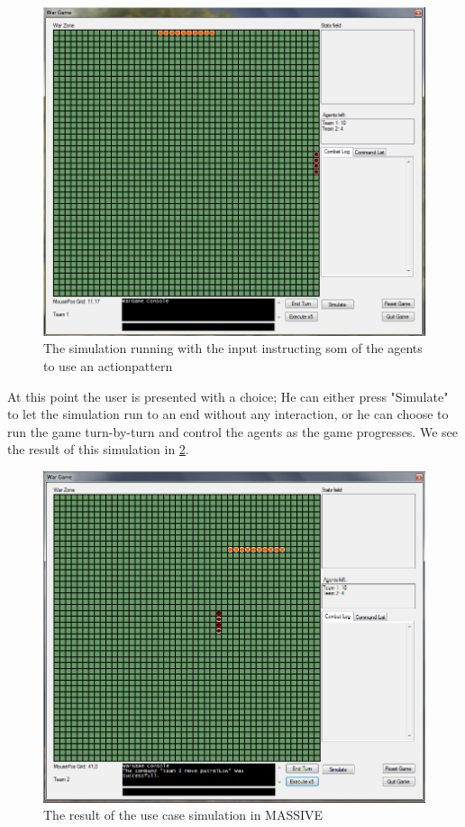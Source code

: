 \begin{figure}%
\begin{center}
\includegraphics[width=\columnwidth]{Images/massive_small.png}%
\end{center}
\caption{The simulation running with the input instructing som of the agents to use an actionpattern}%
\label{fig:runninggame}%
\end{figure}

At this point the user is presented with a choice; He can either press "Simulate" to let the simulation run to an end without any interaction, or he can choose to run the game turn-by-turn and control the agents as the game progresses. We see the result of this simulation in \ref{fig:winner}.

\begin{figure}%
\begin{center}
\includegraphics[width=\columnwidth]{Images/massive_patrollow.png}%
\end{center}
\caption{The result of the use case simulation in MASSIVE}%
\label{fig:winner}%
\end{figure}

